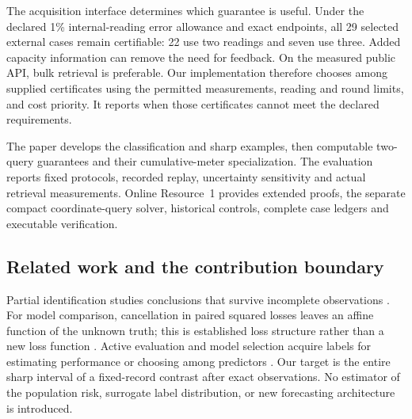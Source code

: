 \documentclass[12pt]{article}
\begin{document}
The acquisition interface determines which guarantee is useful. Under the
declared 1\% internal-reading error allowance and exact endpoints, all 29
selected external cases remain certifiable: 22 use two readings and seven
use three. Added capacity information can remove the need for feedback.
On the measured public API, bulk retrieval is preferable. Our implementation
therefore chooses among supplied certificates using the permitted
measurements, reading and round limits, and cost priority. It reports when
those certificates cannot meet the declared requirements.

The paper develops the classification and sharp examples, then computable
two-query guarantees and their cumulative-meter specialization. The
evaluation reports fixed protocols, recorded replay, uncertainty sensitivity
and actual retrieval measurements. Online Resource~1 provides extended
proofs, the separate compact coordinate-query solver, historical controls,
complete case ledgers and executable verification.

\subsection{Related work and the contribution boundary}
Partial identification studies conclusions that survive incomplete
observations \citep{manski,polo}. For model comparison, cancellation in
paired squared losses leaves an affine function of the unknown truth;
this is established loss structure rather than a new loss function
\citep{patton}. Active evaluation and model selection acquire labels for
estimating performance or choosing among predictors
\citep{sawade,hara,active,okanovic2025}. Our target is the entire sharp
interval of a fixed-record contrast after exact observations. No estimator
of the population risk, surrogate label distribution, or new forecasting
architecture is introduced.
\end{document}
